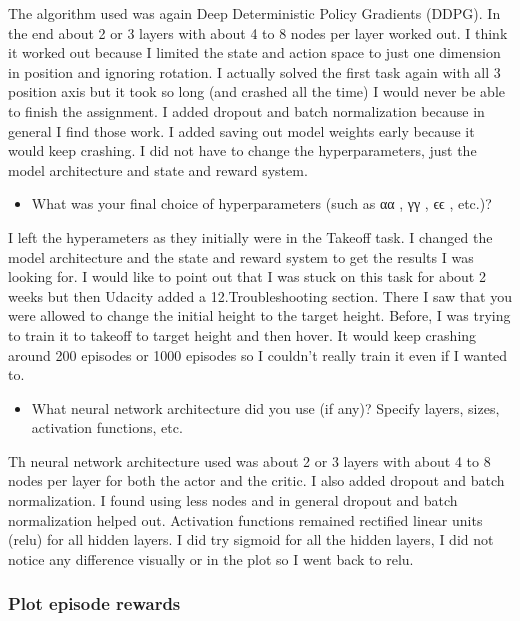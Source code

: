 \documentclass[11pt]{article}
\providecommand{\tightlist}{%
      \setlength{\itemsep}{0pt}\setlength{\parskip}{0pt}}
\begin{document}
The algorithm used was again Deep Deterministic Policy Gradients (DDPG).
In the end about 2 or 3 layers with about 4 to 8 nodes per layer worked
out. I think it worked out because I limited the state and action space
to just one dimension in position and ignoring rotation. I actually
solved the first task again with all 3 position axis but it took so long
(and crashed all the time) I would never be able to finish the
assignment. I added dropout and batch normalization because in general I
find those work. I added saving out model weights early because it would
keep crashing. I did not have to change the hyperparameters, just the
model architecture and state and reward system.

\begin{itemize}
\tightlist
\item
  What was your final choice of hyperparameters (such as αα , γγ , ϵϵ ,
  etc.)?
\end{itemize}

I left the hyperameters as they initially were in the Takeoff task. I
changed the model architecture and the state and reward system to get
the results I was looking for. I would like to point out that I was
stuck on this task for about 2 weeks but then Udacity added a
12.Troubleshooting section. There I saw that you were allowed to change
the initial height to the target height. Before, I was trying to train
it to takeoff to target height and then hover. It would keep crashing
around 200 episodes or 1000 episodes so I couldn't really train it even
if I wanted to.

\begin{itemize}
\tightlist
\item
  What neural network architecture did you use (if any)? Specify layers,
  sizes, activation functions, etc.
\end{itemize}

Th neural network architecture used was about 2 or 3 layers with about 4
to 8 nodes per layer for both the actor and the critic. I also added
dropout and batch normalization. I found using less nodes and in general
dropout and batch normalization helped out. Activation functions
remained rectified linear units (relu) for all hidden layers. I did try
sigmoid for all the hidden layers, I did not notice any difference
visually or in the plot so I went back to relu.

\subsubsection{Plot episode rewards}\label{plot-episode-rewards}
\end{document}
